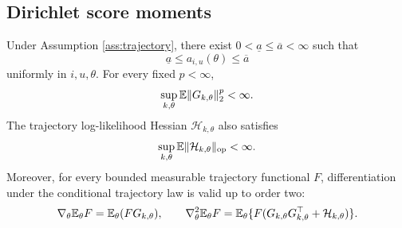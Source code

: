 \subsection{Dirichlet score moments}

\begin{lemma}\label{lem:dirichlet-moments}
Under Assumption \ref{ass:trajectory}, there exist $0<\underline a\le\overline a<\infty$ such that
\begin{equation}\label{eq:concentration-compactness}
 \underline a\le a_{i,u}(\theta)\le\overline a
\end{equation}
uniformly in $i,u,\theta$.  For every fixed $p<\infty$,
\begin{equation}\label{eq:score-moment-bound}
 \sup_{k,\theta}\mathbb E\lVert G_{k,\theta}\rVert_2^p<\infty.
\end{equation}
The trajectory log-likelihood Hessian $\mathcal H_{k,\theta}$ also satisfies
\begin{equation}\label{eq:hessian-moment-bound}
 \sup_{k,\theta}\mathbb E\lVert\mathcal H_{k,\theta}\rVert_{\mathrm{op}}<\infty.
\end{equation}
Moreover, for every bounded measurable trajectory functional $F$, differentiation under the conditional trajectory law is valid up to order two:
\begin{equation}\label{eq:likelihood-ratio-identities}
 \nabla_\theta\mathbb E_\theta F=\mathbb E_\theta(FG_{k,\theta}),
 \qquad
 \nabla_\theta^2\mathbb E_\theta F
 =\mathbb E_\theta\{F(G_{k,\theta}G_{k,\theta}^\top+\mathcal H_{k,\theta})\}.
\end{equation}
\end{lemma}

